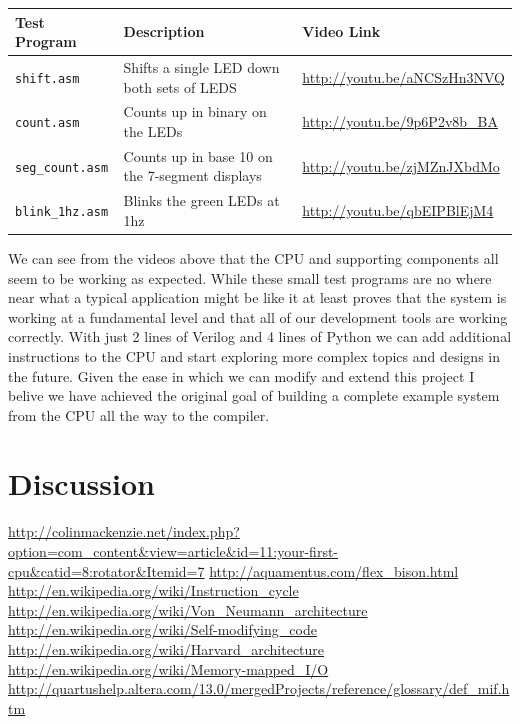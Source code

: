 \documentclass[10pt]{article}
\begin{document}
    \begin{table}[H]
        \centering
        \begin{tabular}{lll}
            \toprule
            \textbf{Test Program} & \textbf{Description} & \textbf{Video Link} \\
            \midrule
            \texttt{shift.asm}      & Shifts a single LED down both sets of LEDS     & \url{http://youtu.be/aNCSzHn3NVQ} \\
            \texttt{count.asm}      & Counts up in binary on the LEDs                & \url{http://youtu.be/9p6P2v8b_BA} \\
            \texttt{seg\_count.asm} & Counts up in base 10 on the 7-segment displays & \url{http://youtu.be/zjMZnJXbdMo} \\
            \texttt{blink\_1hz.asm} & Blinks the green LEDs at 1hz                   & \url{http://youtu.be/qbEIPBlEjM4} \\
            \bottomrule
        \end{tabular}
    \end{table}

    We can see from the videos above that the CPU and supporting components all
    seem to be working as expected. While these small test programs are no
    where near what a typical application might be like it at least proves that
    the system is working at a fundamental level and that all of our
    development tools are working correctly. With just 2 lines of Verilog and 4
    lines of Python we can add additional instructions to the CPU and start
    exploring more complex topics and designs in the future. Given the ease in
    which we can modify and extend this project I belive we have achieved the
    original goal of building a complete example system from the CPU all the
    way to the compiler.

\section{Discussion}

\newpage
\begin{thebibliography}{9}

     \url{http://colinmackenzie.net/index.php?option=com_content&view=article&id=11:your-first-cpu&catid=8:rotator&Itemid=7}
     \url{http://aquamentus.com/flex_bison.html}
     \url{http://en.wikipedia.org/wiki/Instruction_cycle}
     \url{http://en.wikipedia.org/wiki/Von_Neumann_architecture}
     \url{http://en.wikipedia.org/wiki/Self-modifying_code}
     \url{http://en.wikipedia.org/wiki/Harvard_architecture}
     \url{http://en.wikipedia.org/wiki/Memory-mapped_I/O}
     \url{http://quartushelp.altera.com/13.0/mergedProjects/reference/glossary/def_mif.htm}
\end{thebibliography}
\end{document}
